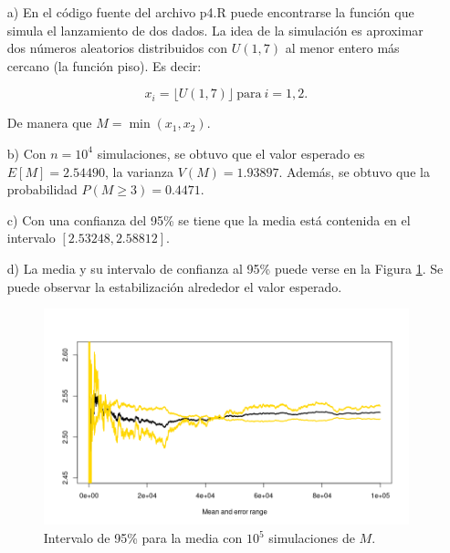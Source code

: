 \documentclass[11pt,letterpaper]{article}
\begin{document}
	\begin{itemize}
		\item[a)] En el código fuente del archivo {\ttfamily p4.R} puede encontrarse la función que simula el lanzamiento de dos dados. La idea de la simulación es aproximar dos números aleatorios distribuidos con $U(1, 7)$ al menor entero más cercano (la función piso). Es decir:
		
		\[
		x_i = \lfloor U(1, 7) \rfloor\ \text{para}\ i=1,2\text{.}
		\]
		
		De manera que $M = \min(x_1, x_2)$.
		\item[b)] Con $n = 10^4$ simulaciones, se obtuvo que el valor esperado es $E[M] = 2.54490$, la varianza $V(M) = 1.93897$. Además, se obtuvo que la probabilidad $P(M \geq 3) = 0.4471$.
		\item[c)] Con una confianza del 95\% se tiene que la media está contenida en el intervalo $[2.53248, 2.58812]$.
		\item[d)] La media y su intervalo de confianza al 95\% puede verse en la Figura \ref{fig:p5d}. Se puede observar la estabilización alrededor el valor esperado.
		
		\begin{figure}[t!]
			\centering
			\includegraphics[width=0.7\linewidth]{../img/p5d}
			\caption{Intervalo de 95\% para la media con $10^5$ simulaciones de $M$.}
			\label{fig:p5d}
		\end{figure}
		
	\end{itemize}
	

	
\end{document}
